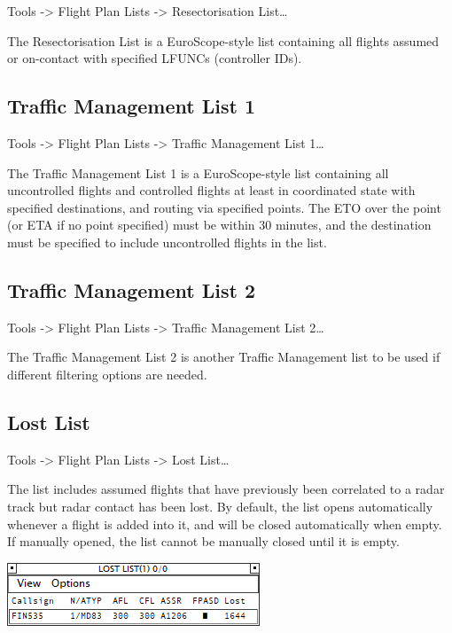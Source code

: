 \documentclass[11pt,a4paper]{memoir}
\begin{document}
\textit{} Tools -> Flight Plan Lists -> Resectorisation List…

The Resectorisation List is a EuroScope-style list containing all flights assumed or on-contact with specified LFUNCs (controller IDs).

\subsection{Traffic Management List 1}
\label{list:tml1}

\textit{} Tools -> Flight Plan Lists -> Traffic Management List 1…

The Traffic Management List 1 is a EuroScope-style list containing all uncontrolled flights and controlled flights at least in coordinated state with specified destinations, and routing via specified points. The ETO over the point (or ETA if no point specified) must be within 30 minutes, and the destination must be specified to include uncontrolled flights in the list.

\subsection{Traffic Management List 2}
\label{list:tml2}

\textit{} Tools -> Flight Plan Lists -> Traffic Management List 2…

The Traffic Management List 2 is another Traffic Management list to be used if different filtering options are needed.

\subsection{Lost List}
\label{list:lost}

\textit{} Tools -> Flight Plan Lists -> Lost List…

The list includes assumed flights that have previously been correlated to a radar track but radar contact has been lost. By default, the list opens automatically whenever a flight is added into it, and will be closed automatically when empty. If manually opened, the list cannot be manually closed until it is empty.

\includegraphics{img/llist.png}
\end{document}
